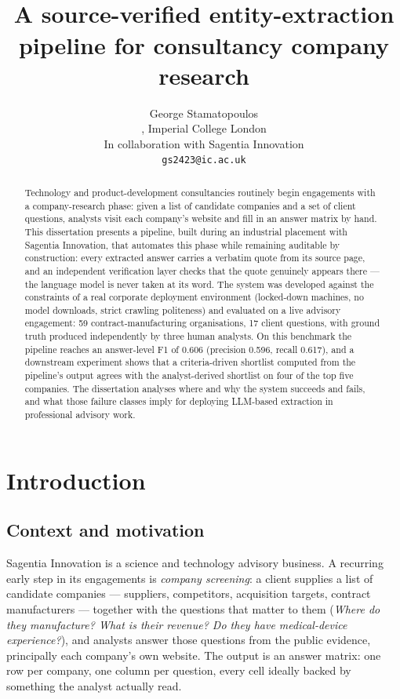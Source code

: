\documentclass[11pt,a4paper]{report}
\title{\todo{Title} \\[1ex]
  \large A source-verified entity-extraction pipeline for consultancy company research}
\author{George Stamatopoulos \\
  \todo{Department}, Imperial College London \\
  In collaboration with Sagentia Innovation \\
  \texttt{gs2423@ic.ac.uk}}
\date{\todo{Submission date}}
\begin{document}
\maketitle

\begin{abstract}
Technology and product-development consultancies routinely begin engagements
with a company-research phase: given a list of candidate companies and a set
of client questions, analysts visit each company's website and fill in an
answer matrix by hand. This dissertation presents a pipeline, built during an
industrial placement with Sagentia Innovation, that automates this phase
while remaining auditable by construction: every extracted answer carries a
verbatim quote from its source page, and an independent verification layer
checks that the quote genuinely appears there --- the language model is never
taken at its word. The system was developed against the constraints of a real
corporate deployment environment (locked-down machines, no model downloads,
strict crawling politeness) and evaluated on a live advisory engagement:
59 contract-manufacturing organisations, 17 client questions, with ground
truth produced independently by three human analysts. On this benchmark the
pipeline reaches an answer-level F1 of 0.606 (precision 0.596, recall 0.617),
and a downstream experiment shows that a criteria-driven shortlist computed
from the pipeline's output agrees with the analyst-derived shortlist on four
of the top five companies. The dissertation analyses where and why the system
succeeds and fails, and what those failure classes imply for deploying
LLM-based extraction in professional advisory work.
\end{abstract}

\tableofcontents

\chapter{Introduction}

\section{Context and motivation}

Sagentia Innovation is a science and technology advisory business. A
recurring early step in its engagements is \emph{company screening}: a client
supplies a list of candidate companies --- suppliers, competitors, acquisition
targets, contract manufacturers --- together with the questions that matter to
them (\emph{Where do they manufacture? What is their revenue? Do they have
medical-device experience?}), and analysts answer those questions from the
public evidence, principally each company's own website. The output is an
answer matrix: one row per company, one column per question, every cell
ideally backed by something the analyst actually read.
\end{document}
